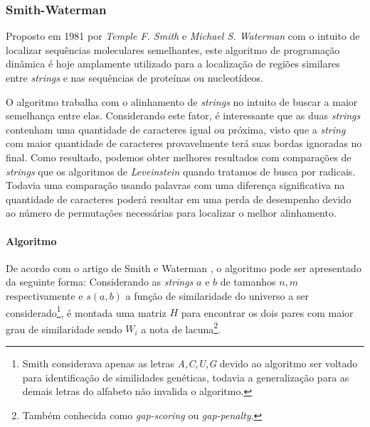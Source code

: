 \subsubsection*{Smith-Waterman} %
\label{sec:smith_waterman}


Proposto em 1981 por \textit{Temple F. Smith} e \textit{Michael S. Waterman} \cite{smith1981identification} com o intuito de localizar sequências moleculares semelhantes, este algoritmo de programação dinâmica é hoje amplamente utilizado para a localização de regiões similares entre \textit{strings} e nas sequências de proteínas ou nucleotídeos.

O algoritmo trabalha com o alinhamento de \textit{strings} no intuito de  buscar a maior semelhança entre elas. Considerando este fator, é interessante que as duas \textit{strings} contenham uma quantidade de caracteres igual ou próxima, visto que  a \textit{string} com  maior quantidade de caracteres provavelmente terá suas bordas ignoradas no final. Como resultado, podemos obter melhores resultados com comparações de \textit{strings} que os algoritmos de \textit{Leveinstein} quando tratamos de busca por radicais. Todavia uma comparação usando palavras com uma diferença significativa na quantidade de caracteres poderá resultar em uma perda de desempenho devido ao número de permutações necessárias para localizar o melhor alinhamento.

\paragraph*{Algoritmo} %
\label{sub:algoritmo}

De acordo com o artigo de Smith e Waterman \cite{smith1981identification}, o algoritmo pode ser apresentado da seguinte forma: 
Considerando as \textit{strings} $a$ e $b$ de tamanhos $n,m$ respectivamente e $s(a,b)$ a função de similaridade do universo a ser considerado\footnote{Smith considerava apenas as letras \textit{A,C,U,G} devido ao algoritmo ser voltado para identificação de similidades genéticas, todavia a generalização para as demais letras do alfabeto não invalida o algoritmo.}, é montada uma matriz $H$  para encontrar os dois pares com maior grau de similaridade sendo $W_i$ a nota de lacuna\footnote{Também conhecida como \textit{gap-scoring} ou \textit{gap-penalty}.}.


